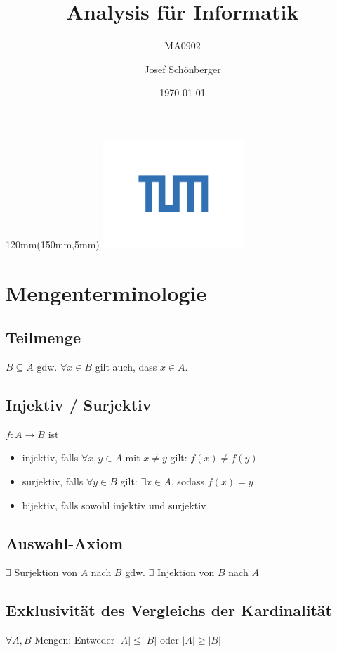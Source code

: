 \documentclass[halfparscip]{scrartcl}
\title{Analysis für Informatik}
\subtitle{MA0902}
\author{Josef Schönberger}
\date{\today}
\renewcommand{\tableofcontents}{\hypersetup{linkcolor=black}\oldtableofcontents\hypersetup{linkcolor=linkblue}}
\newcounter{subsection2}
\begin{document}
\begin{textblock*} {120mm}(150mm,5mm) %
	\includegraphics[width=0.4\textwidth]{tum_logo}
\end{textblock*}

\maketitle
\tableofcontents
\newpage

\section{Mengenterminologie}
\subsection{Teilmenge}
$B \subseteq A$ gdw. $\forall x \in B$ gilt auch, dass $x \in A$.

\subsection{Injektiv / Surjektiv}
$f: A \rightarrow B$ ist
\begin{itemize}
	\item injektiv, falls $\forall x, y \in A$ mit $x \neq y$ gilt: $f(x) \neq f(y)$
	\item surjektiv, falls $\forall y \in B$ gilt: $\exists x \in A$, sodass $f(x) = y$
	\item bijektiv, falls sowohl injektiv und surjektiv
\end{itemize}

\subsection{Auswahl-Axiom}
$\exists$ Surjektion von $A$ nach $B$ gdw. $\exists$ Injektion von $B$ nach $A$

\subsection{Exklusivität des Vergleichs der Kardinalität}
$\forall A, B$ Mengen: Entweder $\vert A\vert \leq \vert B \vert$ oder $\vert A \vert \geq \vert B \vert$
\end{document}
